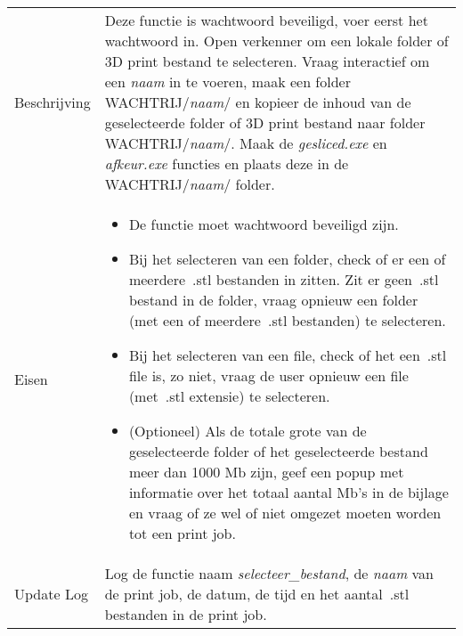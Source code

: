 \documentclass{article}
\begin{document}
\begin{table}[H]
    \centering
    \begin{tabular}%
    {>{\raggedright\arraybackslash}p{}%
    |>{\raggedright\arraybackslash}p{}}
    \rowcolor{myblue}\multicolumn{2}{c}{\rule{0pt}{13pt}Functie: {\Large selecteer\_bestand.exe}} \\\hline
    Beschrijving & Deze functie is wachtwoord beveiligd, voer eerst het wachtwoord in. Open verkenner om een lokale folder of 3D print bestand te selecteren. Vraag interactief om een \textit{naam} in te voeren, maak een folder WACHTRIJ/\textit{naam}/ en kopieer de inhoud van de geselecteerde folder of 3D print bestand naar folder WACHTRIJ/\textit{naam}/. Maak de \textit{gesliced.exe} en \textit{afkeur.exe} functies en plaats deze in de WACHTRIJ/\textit{naam}/ folder.\\
    Eisen & 
    \begin{itemize} 
\item De functie moet wachtwoord beveiligd zijn.
\item Bij het selecteren van een folder, check of er een of meerdere~.stl bestanden in zitten. Zit er geen~.stl bestand in de folder, vraag opnieuw een folder (met een of meerdere~.stl bestanden) te selecteren. 
\item Bij het selecteren van een file, check of het een~.stl file is, zo niet, vraag de user opnieuw een file (met~.stl extensie) te selecteren.
\item (Optioneel) Als de totale grote van de geselecteerde folder of het geselecteerde bestand meer dan 1000 Mb zijn, geef een popup met informatie over het totaal aantal Mb's in de bijlage en vraag of ze wel of niet omgezet moeten worden tot een print job. 
\end{itemize} \\
    Update Log& Log de functie naam \textit{selecteer\_bestand}, de \textit{naam} van de print job, de datum, de tijd en het aantal~.stl bestanden in de print job.\\
    \end{tabular}
\end{table}
\end{document}
